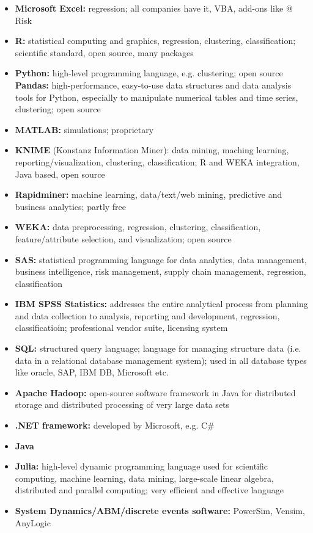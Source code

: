 \documentclass[a4paper, landscape, 6pt, fleqn]{scrartcl}
\renewcommand{\emph}[1]{\textbf{#1}}
\begin{document}
\begin{multicols*}{4}
\begin{itemize}
\item \emph{Microsoft Excel:} regression; all companies have it, VBA, add-ons like $@$Risk
\item \emph{R:} statistical computing and graphics, regression, clustering, classification; scientific standard, open source, many packages
\item \emph{Python:} high-level programming language, e.g. clustering; open source \\
\emph{Pandas:} high-performance, easy-to-use data structures and data analysis tools for Python, especially to manipulate numerical tables and time series, clustering; open source
\item \emph{MATLAB:} simulations; proprietary
\item \emph{KNIME} (Konstanz Information Miner): data mining, maching learning, reporting/visualization, clustering, classification; R and WEKA integration, Java based, open source
\item \emph{Rapidminer:} machine learning, data/text/web mining, predictive and business analytics; partly free
\item \emph{WEKA:} data preprocessing, regression, clustering, classification, feature/attribute selection, and visualization; open source
\item \emph{SAS:} statistical programming language for data analytics, data management, business intelligence, risk management, supply chain management, regression, classification
\item \emph{IBM SPSS Statistics:} addresses the entire analytical process from planning and data collection to analysis, reporting and development, regression, classificatioin; professional vendor suite, licensing system
\item \emph{SQL:} structured query language; language for managing structure data (i.e. data in a relational database management system); used in all database types like oracle, SAP, IBM DB, Microsoft etc.
\item \emph{Apache Hadoop:} open-source software framework in Java for distributed storage and distributed processing of very large data sets
\item \emph{.NET framework:} developed by Microsoft, e.g. C\#
\item \emph{Java}
\item \emph{Julia:} high-level dynamic programming language used for scientific computing, machine learning, data mining, large-scale linear algebra, distributed and parallel computing; very efficient and effective language
\item \emph{System Dynamics/ABM/discrete events software:} PowerSim, Vensim, AnyLogic
\end{itemize}


\end{multicols*}
\end{document}
